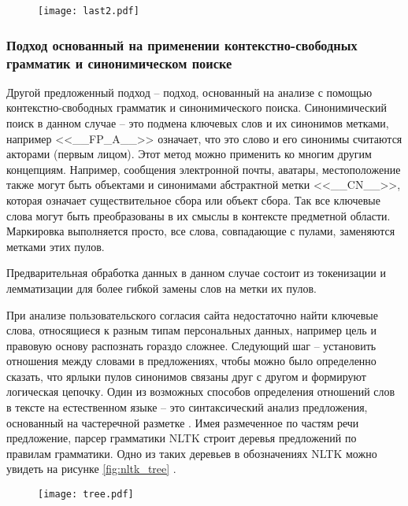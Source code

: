 \documentclass[../main]{subfiles}
\begin{document}
\begin{figure}[H]
    \centering
    {\texttt{[image: last2.pdf]}}
    \vspace{-\baselineskip}
\end{figure}

\subsubsection{Подход основанный на применении контекстно-свободных грамматик и синонимическом поиске}

Другой предложенный подход -- подход, основанный на анализе с помощью контекстно-свободных грамматик и синонимического поиска. Синонимический поиск в данном случае -- это подмена ключевых слов и их синонимов метками, например <<\_\_FP\_A\_\_>> означает, что это слово и его синонимы считаются акторами (первым лицом). Этот метод можно применить ко многим другим концепциям. Например, сообщения электронной почты, аватары, местоположение также могут быть объектами и синонимами абстрактной метки <<\_\_CN\_\_>>, которая означает существительное сбора или объект сбора. Так все ключевые слова могут быть преобразованы в их смыслы в контексте предметной области. Маркировка выполняется просто, все слова, совпадающие с пулами, заменяются метками этих пулов.

Предварительная обработка данных в данном случае состоит из токенизации и лемматизации для более гибкой замены слов на метки их пулов.

При анализе пользовательского согласия сайта недостаточно найти ключевые слова, относящиеся к разным типам персональных данных, например цель и правовую основу распознать гораздо сложнее. Следующий шаг -- установить отношения между словами в предложениях, чтобы можно было определенно сказать, что ярлыки пулов синонимов связаны друг с другом и формируют логическая цепочку. Один из возможных способов определения отношений слов в тексте на естественном языке -- это синтаксический анализ предложения, основанный на частеречной разметке \cite{POS}. Имея размеченное по частям речи предложение, парсер грамматики NLTK \cite{NLTK} строит деревья предложений по правилам грамматики. Одно из таких деревьев в обозначениях NLTK можно увидеть на рисунке \ref{fig:nltk_tree} \cite{NLTK}.

\begin{figure}[H]
    \centering
    {\texttt{[image: tree.pdf]}}
    \vspace{-\baselineskip}
\end{figure}
\end{document}
